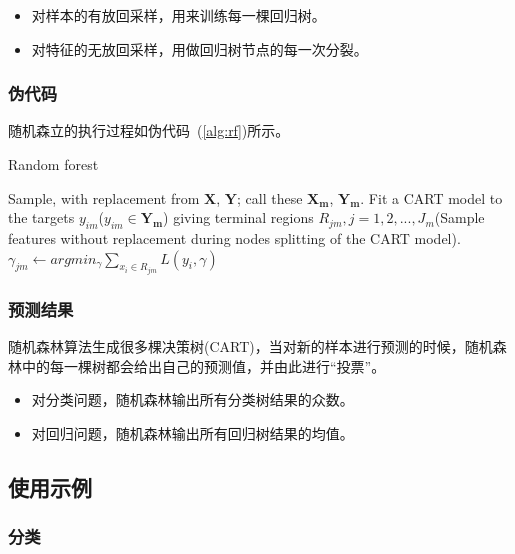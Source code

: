 \documentclass[a4paper,11pt,         %
               ]{article}
\begin{document}
{\begin{itemize}
  \item 对样本的有放回采样，用来训练每一棵回归树。
  \item 对特征的无放回采样，用做回归树节点的每一次分裂。
\end{itemize}

\subsubsection{伪代码}

随机森立的执行过程如伪代码~(\ref{alg:rf})所示。


\begin{algorithm}
  \caption{Random forest}
  \label{alg:rf}
  \begin{algorithmic}[1] %
    \State Sample, with replacement from $\mathbf{X}$, $\mathbf{Y}$; call these $\mathbf{X_{m}}$, $\mathbf{Y_{m}}$.
    \State Fit a CART model to the targets $y_{im}$($y_{im} \in \mathbf{Y_{m}}$) giving terminal regions $R_{jm}, j = 1,2,...,J_{m}$(Sample features without replacement during nodes splitting of the CART model).
      \State $\gamma_{jm} \gets argmin_{\gamma} \sum_{x_{i} \in R_{jm}} L\left ( y_{i}, \gamma \right )$
    \EndFor
  \EndFor
  \end{algorithmic}
\end{algorithm}

\subsubsection{预测结果}

随机森林算法生成很多棵决策树(CART)，当对新的样本进行预测的时候，随机森林中的每一棵树都会给出自己的预测值，并由此进行“投票”。

\begin{itemize}
  \item 对分类问题，随机森林输出所有分类树结果的众数。
  \item 对回归问题，随机森林输出所有回归树结果的均值。
\end{itemize}

\subsection{使用示例}

\subsubsection{分类}

}
\end{document}
